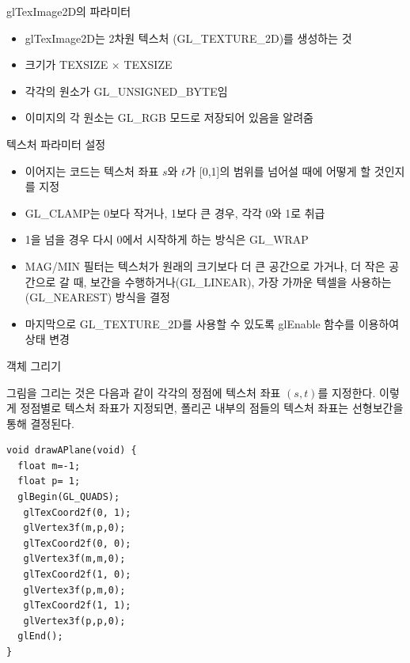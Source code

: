 \documentclass{beamer}
\begin{document}
\begin{frame}[fragile]{{\sf glTexImage2D}의 파라미터}

\begin{itemize}
\item {\sf glTexImage2D}는 2차원 텍스처 ({\sf GL\_TEXTURE\_2D})를 생성하는 것
\item 크기가 {\sf TEXSIZE} $\times$ {\sf TEXSIZE}
\item 각각의 원소가 {\sf GL\_UNSIGNED\_BYTE}임
\item 이미지의 각 원소는 {\sf GL\_RGB} 모드로 저장되어 있음을 알려줌
\end{itemize}

텍스처 파라미터 설정
\begin{itemize}
\item 이어지는 코드는 텍스처 좌표 $s$와 $t$가 [0,1]의 범위를 넘어설 때에 어떻게 할 것인지를 지정
\item {\sf GL\_CLAMP}는 0보다 작거나, 1보다 큰 경우, 각각 0와 1로 취급
\item 1을 넘을 경우 다시 0에서 시작하게 하는 방식은 {\sf GL\_WRAP}
\item {\sf MAG/MIN} 필터는 텍스처가 원래의 크기보다 더 큰 공간으로 가거나, 더 작은 공간으로 갈 때, 보간을 수행하거나({\sf GL\_LINEAR}), 가장 가까운 텍셀을 사용하는({\sf GL\_NEAREST}) 방식을 결정
\item 마지막으로 {\sf GL\_TEXTURE\_2D}를 사용할 수 있도록 glEnable 함수를 이용하여 상태 변경
\end{itemize}


\end{frame}


\begin{frame}[fragile]{객체 그리기}

그림을 그리는 것은 다음과 같이 각각의 정점에 텍스처 좌표 $(s,t)$를 지정한다. 
이렇게 정점별로 텍스처 좌표가 지정되면, 폴리곤 내부의 점들의 텍스처 좌표는 선형보간을 통해 결정된다.

\lstset{language=C++, escapechar=^} 
\begin{lstlisting}
void drawAPlane(void) {
  float m=-1;
  float p= 1;
  glBegin(GL_QUADS);
   glTexCoord2f(0, 1);
   glVertex3f(m,p,0); 
   glTexCoord2f(0, 0);
   glVertex3f(m,m,0); 
   glTexCoord2f(1, 0);
   glVertex3f(p,m,0); 
   glTexCoord2f(1, 1);
   glVertex3f(p,p,0);
  glEnd();
}
\end{lstlisting}


\end{frame}
\end{document}

